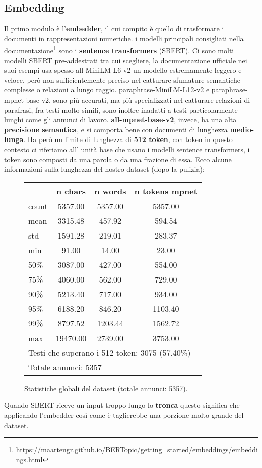 \subsection{Embedding}
Il primo modulo è l'\textbf{embedder}, il cui compito è quello di trasformare i documenti in rappresentazioni numeriche.
i modelli principali consigliati nella documentazione\footnote{\url{https://maartengr.github.io/BERTopic/getting_started/embeddings/embeddings.html}} sono i \textbf{sentence transformers} (SBERT).
Ci sono molti modelli SBERT pre-addestrati tra cui scegliere, la documentazione ufficiale nei suoi esempi usa spesso all-MiniLM-L6-v2 un modello estremamente leggero e veloce, però non sufficientemente preciso nel catturare sfumature semantiche complesse o relazioni a lungo raggio.
paraphrase-MiniLM-L12-v2 e paraphrase-mpnet-base-v2, sono più accurati, ma più specializzati nel catturare relazioni di parafrasi, fra testi molto simili, sono inoltre inadatti a testi particolarmente lunghi come gli annunci di lavoro.
\textbf{all-mpnet-base-v2}, invece, ha una alta \textbf{precisione semantica}, e si comporta bene con documenti di lunghezza \textbf{medio-lunga}.
Ha però un limite di lunghezza di \textbf{512 token}, con token in questo contesto ci riferiamo all' unità base che usano i modelli sentence transformers, i token sono composti da una parola o da una frazione di essa.
Ecco alcune informazioni sulla lunghezza del nostro dataset (dopo la pulizia):
\begin{figure}[H]
\centering
\scriptsize
\begin{tabular}{lccc}
\hline
 & n chars & n words & n tokens mpnet \\
\hline
count & 5357.00 & 5357.00 & 5357.00 \\
mean & 3315.48 & 457.92 & 594.54 \\
std & 1591.28 & 219.01 & 283.37 \\
min & 91.00 & 14.00 & 23.00 \\
50\% & 3087.00 & 427.00 & 554.00 \\
75\% & 4060.00 & 562.00 & 729.00 \\
90\% & 5213.40 & 717.00 & 934.00 \\
95\% & 6188.20 & 846.20 & 1103.40 \\
99\% & 8797.52 & 1203.44 & 1562.72 \\
max & 19470.00 & 2739.00 & 3753.00 \\
\hline
\multicolumn{4}{l}{Testi che superano i 512 token: 3075 (57.40\%)} \\
\multicolumn{4}{l}{Totale annunci: 5357} \\
\hline
\end{tabular}
\caption{Statistiche globali del dataset (totale annunci: 5357).}
\label{fig:dataset-stats}
\end{figure}
\noindent Quando SBERT riceve un input troppo lungo lo \textbf{tronca} questo significa che applicando l'embedder così come è taglierebbe una porzione molto grande del dataset.

